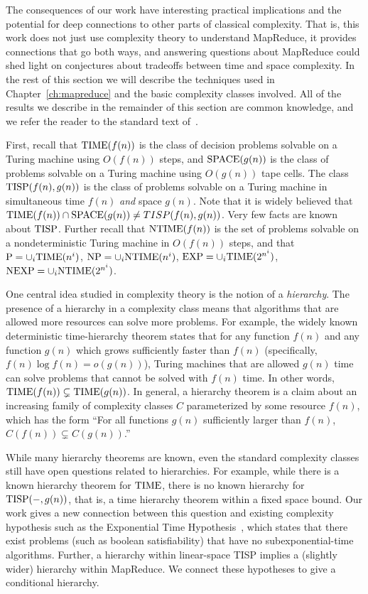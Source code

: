 The consequences of our work have interesting practical implications and the
potential for deep connections to other parts of classical complexity. That is,
this work does not just use complexity theory to understand MapReduce, it
provides connections that go both ways, and answering questions about MapReduce
could shed light on conjectures about tradeoffs between time and space
complexity. In the rest of this section we will describe the techniques used in
Chapter~\ref{ch:mapreduce} and the basic complexity classes involved. All of
the results we describe in the remainder of this section are common knowledge,
and we refer the reader to the standard text of~\cite{AroraB09}.

First, recall that $\textup{TIME}(f(n))$ is the class of decision problems solvable on
a Turing machine using $O(f(n))$ steps, and $\textup{SPACE}(g(n))$ is the class of
problems solvable on a Turing machine using $O(g(n))$ tape cells. The class
$\textup{TISP}(f(n), g(n))$ is the class of problems solvable on a Turing machine in
simultaneous time $f(n)$ \emph{and} space $g(n)$. Note that it is widely
believed that $\textup{TIME}(f(n)) \cap \textup{SPACE}(g(n)) \neq TISP(f(n), g(n))$. Very few
facts are known about $\textup{TISP}$. Further recall that $\textup{NTIME}(f(n))$ is the set of
problems solvable on a nondeterministic Turing machine in $O(f(n))$ steps, and
that $\textup{P} = \cup_i \textup{TIME}(n^i)$, $\textup{NP} = \cup_i \textup{NTIME}(n^i)$, $\textup{EXP} = \cup_i
\textup{TIME}(2^{n^i})$, $\textup{NEXP} = \cup_i \textup{NTIME}(2^{n^i})$. 

One central idea studied in complexity theory is the notion of a
\emph{hierarchy}. The presence of a hierarchy in a complexity class means that
algorithms that are allowed more resources can solve more problems. For
example, the widely known deterministic time-hierarchy theorem states that for
any function $f(n)$ and any function $g(n)$ which grows sufficiently faster
than $f(n)$ (specifically, $f(n) \log f(n) = o(g(n))$), Turing machines that
are allowed $g(n)$ time can solve problems that cannot be solved with $f(n)$
time. In other words, $\textup{TIME}(f(n)) \subsetneq \textup{TIME}(g(n))$. In general, a
hierarchy theorem is a claim about an increasing family of complexity classes
$C$ parameterized by some resource $f(n)$, which has the form ``For all
functions $g(n)$ sufficiently larger than $f(n)$, $C(f(n)) \subsetneq
C(g(n))$.'' 

While many hierarchy theorems are known, even the standard complexity classes
still have open questions related to hierarchies. For example, while there is a
known hierarchy theorem for $\textup{TIME}$, there is no known hierarchy for $\textup{TISP}(-,
g(n))$, that is, a time hierarchy theorem within a fixed space bound. Our work
gives a new connection between this question and existing complexity hypothesis
such as the Exponential Time Hypothesis~\cite{ImpagliazzoPZ01}, which states
that there exist problems (such as boolean satisfiability) that have no
subexponential-time algorithms.  Further, a hierarchy within linear-space TISP
implies a (slightly wider) hierarchy within MapReduce. We connect these
hypotheses to give a conditional hierarchy. 

